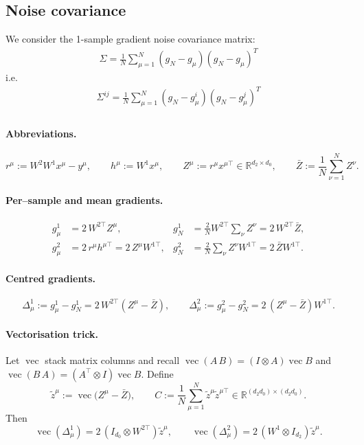 \documentclass[11pt]{article}
\begin{document}
\subsection{Noise covariance}
We consider the 1-sample gradient noise covariance matrix:
\begin{align}
    \Sigma = \frac{1}{N} \sum_{\mu=1}^{N} (g_N - g_{\mu})(g_N - g_{\mu})^T
\end{align}
i.e.
\begin{align}
    \Sigma^{ij} = \frac{1}{N} \sum_{\mu=1}^{N} (g_N - g^i_{\mu})(g_N - g^j_{\mu})^T\\
\end{align}


\paragraph{Abbreviations.}
\[
r^{\mu}:=W^{2}W^{1}x^{\mu}-y^{\mu},
\qquad
h^{\mu}:=W^{1}x^{\mu},
\qquad
Z^{\mu}:=r^{\mu}x^{\mu\!\top}\in\mathbb R^{d_{2}\times d_{0}},
\qquad
\bar Z:=\frac1N\sum_{\nu=1}^{N}Z^{\nu}.
\]

\paragraph{Per–sample and mean gradients.}
\[
\begin{aligned}
g^{1}_{\mu}&=2\,W^{2\!\top}Z^{\mu},
& g^{1}_{N}&=\frac{2}{N}W^{2\!\top}\sum_{\nu}Z^{\nu}=2\,W^{2\!\top}\bar Z,\\[4pt]
g^{2}_{\mu}&=2\,r^{\mu}h^{\mu\!\top}=2\,Z^{\mu}W^{1\!\top},
& g^{2}_{N}&=\frac{2}{N}\sum_{\nu}Z^{\nu}W^{1\!\top}=2\,\bar ZW^{1\!\top}.
\end{aligned}
\]

\paragraph{Centred gradients.}
\[
\Delta^{1}_{\mu}:=g^{1}_{\mu}-g^{1}_{N}=2\,W^{2\!\top}\!(Z^{\mu}-\bar Z),
\qquad
\Delta^{2}_{\mu}:=g^{2}_{\mu}-g^{2}_{N}=2\,(Z^{\mu}-\bar Z)W^{1\!\top}.
\]

\paragraph{Vectorisation trick.}
Let \(\operatorname{vec}\) stack matrix columns and recall
\(\operatorname{vec}(A\,B)=(I\!\otimes\!A)\operatorname{vec}B\) and
\(\operatorname{vec}(B\,A)=(A^{\top}\!\otimes\!I)\operatorname{vec}B\).
Define
\[
\tilde z^{\mu}:=\operatorname{vec}\bigl(Z^{\mu}-\bar Z\bigr),
\qquad
C:=\frac1N\sum_{\mu=1}^{N}\tilde z^{\mu}\tilde z^{\mu\!\top}
      \in\mathbb R^{(d_{2}d_{0})\times(d_{2}d_{0})}.
\]
Then
\[
\operatorname{vec}(\Delta^{1}_{\mu})=2\,(I_{d_{0}}\!\otimes\!W^{2\!\top})\tilde z^{\mu},
\qquad
\operatorname{vec}(\Delta^{2}_{\mu})=2\,(W^{1}\!\otimes\!I_{d_{2}})\tilde z^{\mu}.
\]
\end{document}
